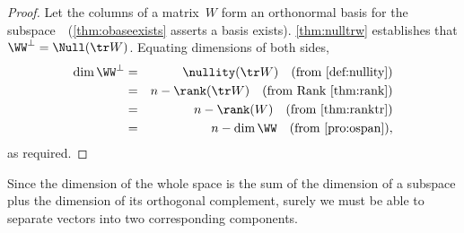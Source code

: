 \begin{proof} 
Let the columns of a matrix~\(W\) form an orthonormal basis for the subspace~\WW\ (\autoref{thm:obaseexists} asserts a basis exists).
\autoref{thm:nulltrw} establishes that \(\WW^\perp=\Null(\tr W)\).
Equating dimensions of both sides, 
\begin{eqnarray*}
\dim\WW^\perp&=&\nullity(\tr W) 
\quad(\text{from \autoref{def:nullity}})
\\&=&n-\rank(\tr W)
\quad(\text{from Rank \autoref{thm:rank}})
\\&=&n-\rank(W)
\quad(\text{from \autoref{thm:ranktr}})
\\&=&n-\dim\WW
\quad(\text{from \autoref{pro:ospan}}),
\end{eqnarray*}
as required.
\end{proof}


Since the dimension of the whole space is the sum of the dimension of a subspace plus the dimension of its orthogonal complement, surely we must be able to separate vectors into two corresponding components.

